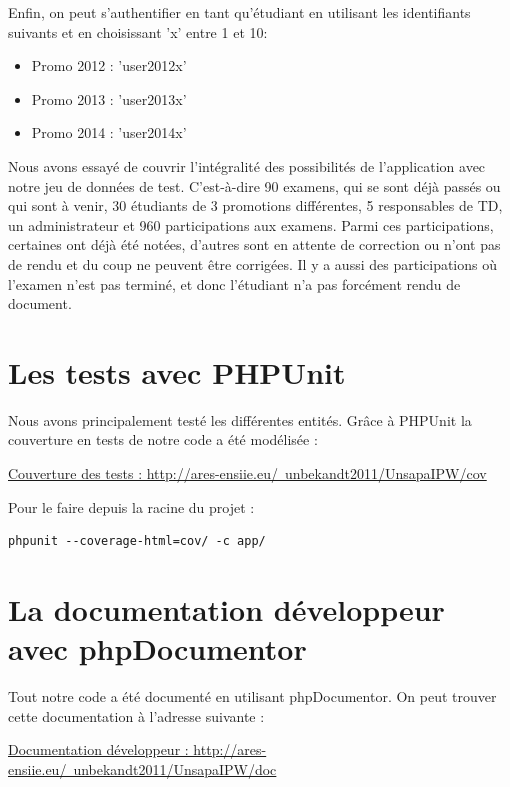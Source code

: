 \documentclass{report}
\begin{document}
        Enfin, on peut s'authentifier en tant qu'étudiant en utilisant les
        identifiants suivants et en choisissant 'x' entre 1 et 10:
        
        \begin{itemize}
          \item{Promo 2012 : 'user2012x'}
          \item{Promo 2013 : 'user2013x'}
          \item{Promo 2014 : 'user2014x'}
        \end{itemize}
        
        Nous avons essayé de couvrir l'intégralité des possibilités de l'application
        avec notre jeu de données de test. C'est-à-dire 90 examens, qui se sont
        déjà passés ou qui sont à venir, 30 étudiants de 3 promotions différentes,
        5 responsables de TD, un administrateur et 960 participations aux examens.
        Parmi ces participations, certaines ont déjà été notées, d'autres sont en 
        attente de correction ou n'ont pas de rendu et du coup ne peuvent
        être corrigées. Il y a aussi des participations où l'examen n'est pas terminé,
        et donc l'étudiant n'a pas forcément rendu de document.

    \section{Les tests avec PHPUnit}
	  Nous avons principalement testé les différentes entités. Grâce à PHPUnit
      la couverture en tests de notre code a été modélisée : 

			\href{http://ares-ensiie.eu/~unbekandt2011/UnsapaIPW/cov}{Couverture des tests : http://ares-ensiie.eu/~unbekandt2011/UnsapaIPW/cov}

      Pour le faire depuis la racine du projet :
      \begin{verbatim}phpunit --coverage-html=cov/ -c app/\end{verbatim}

    \section{La documentation développeur avec phpDocumentor}
			Tout notre code a été documenté en utilisant phpDocumentor. On peut 
      trouver cette documentation à l'adresse suivante :

			\href{http://ares-ensiie.eu/~unbekandt2011/UnsapaIPW/doc}{Documentation développeur : http://ares-ensiie.eu/~unbekandt2011/UnsapaIPW/doc}
\end{document}
